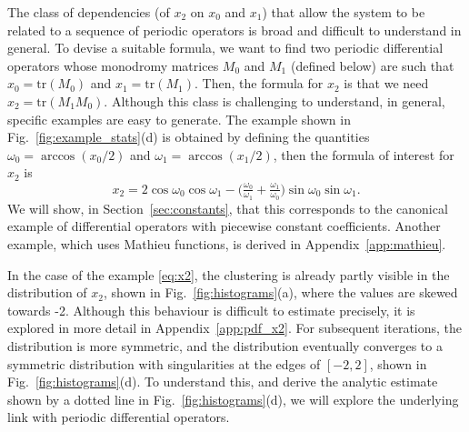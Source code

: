 \documentclass[nofootinbib,prb,amsmath,amssymb,twocolumn,floatfix]{revtex4-2}
\theoremstyle{definition}
\newcommand{\tr}{\mathrm{tr}}
\begin{document}
The class of dependencies (of $x_2$ on $x_0$ and $x_1$) that allow the system to be related to a sequence of periodic operators is broad and difficult to understand in general. To devise a suitable formula, we want to find two periodic differential operators whose monodromy matrices $M_0$ and $M_1$ (defined below) are such that $x_0=\tr(M_0)$ and $x_1=\tr(M_1)$. Then, the formula for $x_2$ is that we need $x_2=\tr(M_1M_0)$. Although this class is challenging to understand, in  general, specific examples are easy to generate. The example shown in Fig.~\ref{fig:example_stats}(d) is obtained by defining the quantities $\omega_0=\arccos(x_0/2)$ and $\omega_1=\arccos(x_1/2)$, then the formula of interest for $x_2$ is 
\begin{equation} \label{eq:x2}
	x_2 = 2\cos\omega_0\cos\omega_1-\big( \tfrac{\omega_0}{\omega_1} + \tfrac{\omega_1}{\omega_0} \big) \sin\omega_0\sin\omega_1.
\end{equation}
We will show, in Section~\ref{sec:constants}, that this corresponds to the canonical example of differential operators with piecewise constant coefficients. Another example, which uses Mathieu functions, is derived in Appendix~\ref{app:mathieu}.

In the case of the example \eqref{eq:x2}, the clustering is already partly visible in the distribution of $x_2$, shown in Fig.~\ref{fig:histograms}(a), where the values are skewed towards -2. Although this behaviour is difficult to estimate precisely, it is explored in more detail in Appendix~\ref{app:pdf_x2}. For subsequent iterations, the distribution is more symmetric, and the distribution eventually converges to a symmetric distribution with singularities at the edges of $[-2,2]$, shown in Fig.~\ref{fig:histograms}(d). To understand this, and derive the analytic estimate shown by a dotted line in Fig.~\ref{fig:histograms}(d), we will explore the underlying link with periodic differential operators.






\end{document}
